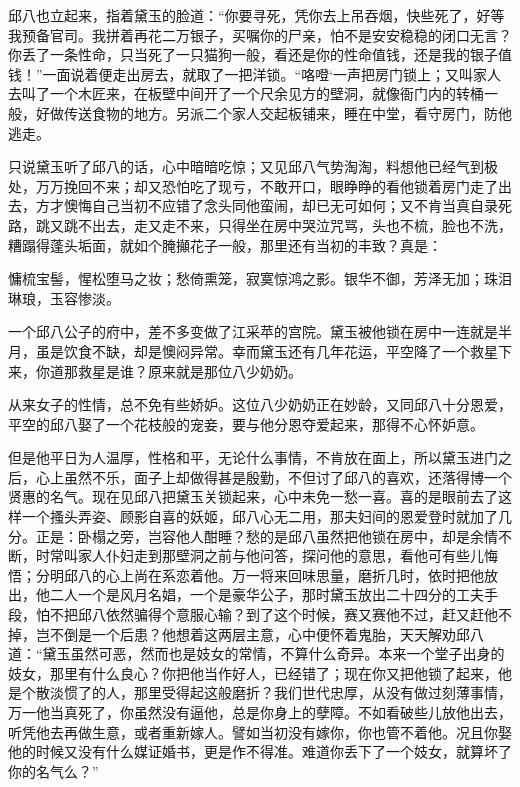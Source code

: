 \documentclass[12pt,UTF8]{ctexbook}
\begin{document}
{{{邱八也立起来，指着黛玉的脸道：“你要寻死，凭你去上吊吞烟，快些死了，好等我预备官司。我拼着再花二万银子，买嘱你的尸亲，怕不是安安稳稳的闭口无言？你丢了一条性命，只当死了一只猫狗一般，看还是你的性命值钱，还是我的银子值钱！”一面说着便走出房去，就取了一把洋锁。“咯噔‘一声把房门锁上；又叫家人去叫了一个木匠来，在板壁中间开了一个尺余见方的壁洞，就像衙门内的转桶一般，好做传送食物的地方。另派二个家人交起板铺来，睡在中堂，看守房门，防他逃走。

只说黛玉听了邱八的话，心中暗暗吃惊；又见邱八气势淘淘，料想他已经气到极处，万万挽回不来；却又恐怕吃了现亏，不敢开口，眼睁睁的看他锁着房门走了出去，方才懊悔自己当初不应错了念头同他蛮闹，却已无可如何；又不肯当真自录死路，跳又跳不出去，走又走不来，只得坐在房中哭泣咒骂，头也不梳，脸也不洗，糟蹋得蓬头垢面，就如个腌攧花子一般，那里还有当初的丰致？真是：

慵梳宝髻，惺松堕马之妆；愁倚熏笼，寂寞惊鸿之影。银华不御，芳泽无加；珠泪琳琅，玉容惨淡。

一个邱八公子的府中，差不多变做了江采苹的宫院。黛玉被他锁在房中一连就是半月，虽是饮食不缺，却是懊闷异常。幸而黛玉还有几年花运，平空降了一个救星下来，你道那救星是谁？原来就是那位八少奶奶。

从来女子的性情，总不免有些娇妒。这位八少奶奶正在妙龄，又同邱八十分恩爱，平空的邱八娶了一个花枝般的宠妾，要与他分恩夺爱起来，那得不心怀妒意。

但是他平日为人温厚，性格和平，无论什么事情，不肯放在面上，所以黛玉进门之后，心上虽然不乐，面子上却做得甚是殷勤，不但讨了邱八的喜欢，还落得博一个贤惠的名气。现在见邱八把黛玉关锁起来，心中未免一愁一喜。喜的是眼前去了这样一个搔头弄姿、顾影自喜的妖姬，邱八心无二用，那夫妇间的恩爱登时就加了几分。正是：卧榻之旁，岂容他人酣睡？愁的是邱八虽然把他锁在房中，却是余情不断，时常叫家人仆妇走到那壁洞之前与他问答，探问他的意思，看他可有些儿悔悟；分明邱八的心上尚在系恋着他。万一将来回味思量，磨折几时，依时把他放出，他二人一个是风月名娼，一个是豪华公子，那时黛玉放出二十四分的工夫手段，怕不把邱八依然骗得个意服心输？到了这个时候，赛又赛他不过，赶又赶他不掉，岂不倒是一个后患？他想着这两层主意，心中便怀着鬼胎，天天解劝邱八道：“黛玉虽然可恶，然而也是妓女的常情，不算什么奇异。本来一个堂子出身的妓女，那里有什么良心？你把他当作好人，已经错了；现在你又把他锁了起来，他是个散淡惯了的人，那里受得起这般磨折？我们世代忠厚，从没有做过刻薄事情，万一他当真死了，你虽然没有逼他，总是你身上的孽障。不如看破些儿放他出去，听凭他去再做生意，或者重新嫁人。譬如当初没有嫁你，你也管不着他。况且你娶他的时候又没有什么媒证婚书，更是作不得准。难道你丢下了一个妓女，就算坏了你的名气么？”

}}}
\end{document}

